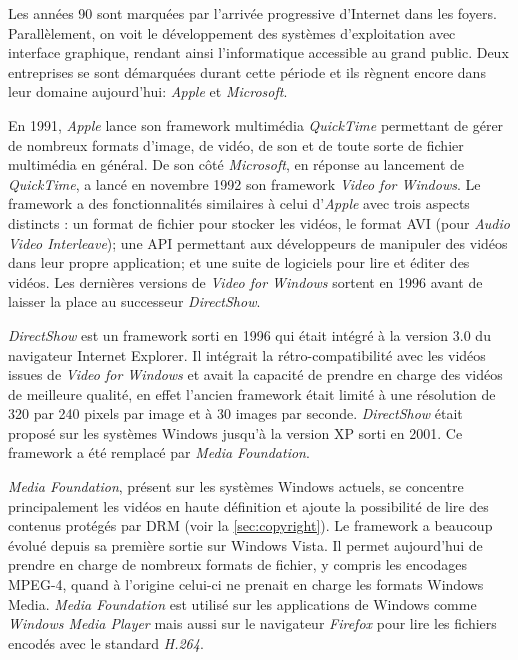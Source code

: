 \documentclass{polytech/polytech}
\begin{document}
Les années 90 sont marquées par l'arrivée progressive d'Internet dans les foyers. Parallèlement, on voit le développement des systèmes d'exploitation avec interface graphique, rendant ainsi l'informatique accessible au grand public. Deux entreprises se sont démarquées durant cette période et ils règnent encore dans leur domaine aujourd'hui: \textit{Apple} et \textit{Microsoft}. 

En 1991, \textit{Apple} lance son framework multimédia \textit{QuickTime} permettant de gérer de nombreux formats d'image, de vidéo, de son et de toute sorte de fichier multimédia en général. De son côté \textit{Microsoft}, en réponse au lancement de \textit{QuickTime}, a lancé en novembre 1992 son framework \textit{Video for Windows}. Le framework a des fonctionnalités similaires à celui d'\textit{Apple} avec trois aspects distincts : un format de fichier pour stocker les vidéos, le format AVI (pour \textit{Audio Video Interleave}); une API permettant aux développeurs de manipuler des vidéos dans leur propre application; et une suite de logiciels pour lire et éditer des vidéos. Les dernières versions de \textit{Video for Windows} sortent en 1996 avant de laisser la place au successeur \textit{DirectShow}.

\textit{DirectShow} est un framework sorti en 1996 qui était intégré à la version 3.0 du navigateur Internet Explorer. Il intégrait la rétro-compatibilité avec les vidéos issues de \textit{Video for Windows} et avait la capacité de prendre en charge des vidéos de meilleure qualité, en effet l'ancien framework était limité à une résolution de 320 par 240 pixels par image et à 30 images par seconde. \textit{DirectShow} était proposé sur les systèmes Windows jusqu'à la version XP sorti en 2001. Ce framework a été remplacé par \textit{Media Foundation}. 

\textit{Media Foundation}, présent sur les systèmes Windows actuels, se concentre principalement les vidéos en haute définition et ajoute la possibilité de lire des contenus protégés par DRM (voir la \autoref{sec:copyright}). Le framework a beaucoup évolué depuis sa première sortie sur Windows Vista. Il permet aujourd'hui de prendre en charge de nombreux formats de fichier, y compris les encodages MPEG-4, quand à l'origine celui-ci ne prenait en charge les formats Windows Media. \textit{Media Foundation} est utilisé sur les applications de Windows comme \textit{Windows Media Player} mais aussi sur le navigateur \textit{Firefox} pour lire les fichiers encodés avec le standard \textit{H.264}.
\end{document}
